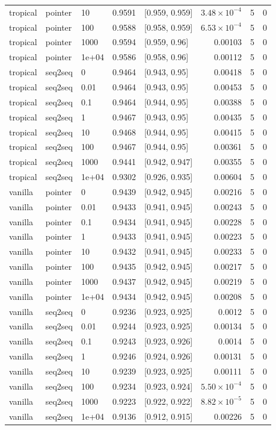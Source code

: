 \documentclass[10pt]{article}
\begin{document}
{\begin{longtable}{lllrlrrr}
tropical & pointer & 10 & 0.9591 & [0.959, 0.959] & $3.48\times10^{-4}$ & 5 & 0\\
tropical & pointer & 100 & 0.9588 & [0.958, 0.959] & $6.53\times10^{-4}$ & 5 & 0\\
tropical & pointer & 1000 & 0.9594 & [0.959, 0.96] & 0.00103 & 5 & 0\\
tropical & pointer & 1e+04 & 0.9586 & [0.958, 0.96] & 0.00112 & 5 & 0\\
tropical & seq2seq & 0 & 0.9464 & [0.943, 0.95] & 0.00418 & 5 & 0\\
tropical & seq2seq & 0.01 & 0.9464 & [0.943, 0.95] & 0.00453 & 5 & 0\\
tropical & seq2seq & 0.1 & 0.9464 & [0.944, 0.95] & 0.00388 & 5 & 0\\
tropical & seq2seq & 1 & 0.9467 & [0.943, 0.95] & 0.00435 & 5 & 0\\
tropical & seq2seq & 10 & 0.9468 & [0.944, 0.95] & 0.00415 & 5 & 0\\
tropical & seq2seq & 100 & 0.9467 & [0.944, 0.95] & 0.00361 & 5 & 0\\
tropical & seq2seq & 1000 & 0.9441 & [0.942, 0.947] & 0.00355 & 5 & 0\\
tropical & seq2seq & 1e+04 & 0.9302 & [0.926, 0.935] & 0.00604 & 5 & 0\\
vanilla & pointer & 0 & 0.9439 & [0.942, 0.945] & 0.00216 & 5 & 0\\
vanilla & pointer & 0.01 & 0.9433 & [0.941, 0.945] & 0.00243 & 5 & 0\\
vanilla & pointer & 0.1 & 0.9434 & [0.941, 0.945] & 0.00228 & 5 & 0\\
vanilla & pointer & 1 & 0.9433 & [0.941, 0.945] & 0.00223 & 5 & 0\\
vanilla & pointer & 10 & 0.9432 & [0.941, 0.945] & 0.00233 & 5 & 0\\
vanilla & pointer & 100 & 0.9435 & [0.942, 0.945] & 0.00217 & 5 & 0\\
vanilla & pointer & 1000 & 0.9437 & [0.942, 0.945] & 0.00219 & 5 & 0\\
vanilla & pointer & 1e+04 & 0.9434 & [0.942, 0.945] & 0.00208 & 5 & 0\\
vanilla & seq2seq & 0 & 0.9236 & [0.923, 0.925] & 0.0012 & 5 & 0\\
vanilla & seq2seq & 0.01 & 0.9244 & [0.923, 0.925] & 0.00134 & 5 & 0\\
vanilla & seq2seq & 0.1 & 0.9243 & [0.923, 0.926] & 0.0014 & 5 & 0\\
vanilla & seq2seq & 1 & 0.9246 & [0.924, 0.926] & 0.00131 & 5 & 0\\
vanilla & seq2seq & 10 & 0.9239 & [0.923, 0.925] & 0.00111 & 5 & 0\\
vanilla & seq2seq & 100 & 0.9234 & [0.923, 0.924] & $5.50\times10^{-4}$ & 5 & 0\\
vanilla & seq2seq & 1000 & 0.9223 & [0.922, 0.922] & $8.82\times10^{-5}$ & 5 & 0\\
vanilla & seq2seq & 1e+04 & 0.9136 & [0.912, 0.915] & 0.00226 & 5 & 0\\
\bottomrule
\end{longtable}
}
\end{document}
